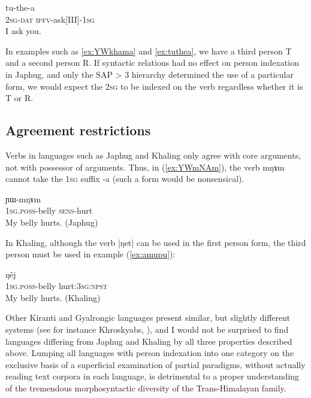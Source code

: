 \documentclass[oldfontcommands,oneside,a4paper,11pt]{article}
\newcommand{\ipa}[1]{{\phon \mbox{#1}}} %
\begin{document}
\begin{exe}
\ex \label{ex:tuthea}
\gll \ipa{nɤ-ɕki} 	\ipa{tu-the-a} \\
\textsc{2sg-dat} \textsc{ipfv}-ask[III]-\textsc{1sg} \\
\glt I ask you.
\end{exe}

In examples such as \ref{ex:YWkhama} and \ref{ex:tuthea}, we have a third person T and a second person R. If syntactic relations had no effect on person indexation in Japhug, and only the SAP > 3 hierarchy determined the use of a particular form, we would expect the \textsc{2sg} to be indexed on the verb regardless whether it is T or R.

\subsection{Agreement restrictions}
Verbs in languages such as Japhug and Khaling only agree with core arguments, not with possessor of arguments. Thus, in (\ref{ex:YWmNAm}), the verb \ipa{mŋɤm} cannot take the \textsc{1sg} suffix \ipa{-a} (such a form would be nonsensical).

\begin{exe}
\ex \label{ex:YWmNAm}
\gll \ipa{a-xtu} 	\ipa{ɲɯ-mŋɤm} \\
\textsc{1sg.poss}-belly \textsc{sens}-hurt \\
\glt My belly hurts. (Japhug)
\end{exe}

In Khaling, although the verb \ipa{|ŋet|} can be used in the first person form, the third person must be used in example (\ref{ex:amupu}):

\begin{exe}
\ex \label{ex:amupu}
\gll \ipa{ʔʌ-mupu} 	\ipa{ŋêj} \\
\textsc{1sg.poss}-belly hurt:\textsc{3sg:npst} \\
\glt My belly hurts. (Khaling)
\end{exe}

Other Kiranti and Gyalrongic languages present similar, but slightly different systems (see for instance Khroskyabs, \citealt{lai15person}), and I would not be surprised to find languages differing from Japhug and Khaling by all three properties described above. Lumping all languages with person indexation into one category on the exclusive basis of a superficial examination of partial paradigms, without actually reading text corpora in each  language, is detrimental to a proper understanding of the tremendous morphosyntactic diversity of the Trans-Himalayan family.
\end{document}
